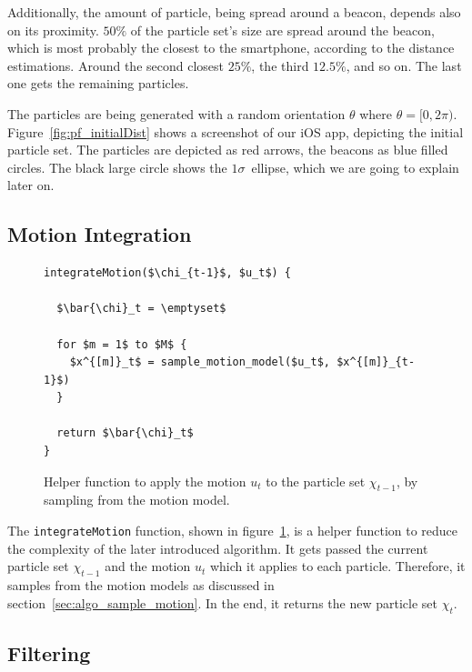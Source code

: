Additionally, the amount of particle, being spread around a beacon, depends also on its proximity. $50\%$ of the particle set's size are spread around the beacon, which is most probably the closest to the smartphone, according to the distance estimations. Around the second closest $25\%$, the third $12.5\%$, and so on. The last one gets the remaining particles.

The particles are being generated with a random orientation $\theta$ where $\theta = [0, 2\pi)$. Figure~\ref{fig:pf_initialDist} shows a screenshot of our iOS app, depicting the initial particle set. The particles are depicted as red arrows, the beacons as blue filled circles. The black large circle shows the $1\sigma$~ellipse, which we are going to explain later on.


\subsection{Motion Integration}

\begin{figure}
\begin{lstlisting}[mathescape]
integrateMotion($\chi_{t-1}$, $u_t$) {

  $\bar{\chi}_t = \emptyset$

  for $m = 1$ to $M$ {
    $x^{[m]}_t$ = sample_motion_model($u_t$, $x^{[m]}_{t-1}$)
  }
  
  return $\bar{\chi}_t$
}		
\end{lstlisting}
\caption{Helper function to apply the motion $u_t$ to the particle set $\chi_{t-1}$, by sampling from the motion model.}
\label{lst:pf_integrateMotion}
\end{figure}

The \texttt{integrateMotion} function, shown in figure~\ref{lst:pf_integrateMotion}, is a helper function to reduce the complexity of the later introduced algorithm. It gets passed the current particle set $\chi_{t-1}$ and the motion $u_t$ which it applies to each particle. Therefore, it samples from the motion models as discussed in section~\ref{sec:algo_sample_motion}. In the end, it returns the new particle set $\chi_t$.


\subsection{Filtering}

